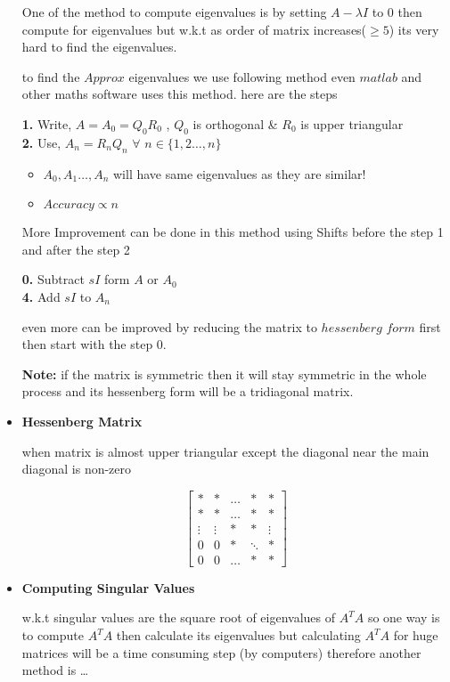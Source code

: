 \documentclass[a4paper]{article}
\numberwithin{equation}{section}
\begin{document}
\begin{itemize}
One of the method to compute eigenvalues is by setting $A-\lambda I$ to 0 then compute for eigenvalues but w.k.t as order of matrix increases($\geq 5$) its very hard to find the eigenvalues.

to find the $Approx$ eigenvalues we use following method even $matlab$ and other maths software uses this method. here are the steps


\textbf{1.} Write, $A=A_0=Q_0R_0$ , $Q_0$ is orthogonal \& $R_0$ is upper triangular\\
\textbf{2.} Use, $A_n=R_nQ_n$ $\forall$ $n \in \{1,2\dots,n\}$
\begin{itemize}
    \item $A_0,A_1\dots,A_n$ will have same eigenvalues as they are similar!
    \item $Accuracy \propto n$
\end{itemize}

More Improvement can be done in this method using Shifts before the step 1 and after the step 2

\textbf{0.} Subtract $sI$ form $A$ or $A_0$\\
\textbf{4.} Add $sI$ to $A_n$

even more can be improved by reducing the matrix to $hessenberg$ $form$ first then start with the step 0.

\textbf{Note:} if the matrix is symmetric then it will stay symmetric in the whole process and its hessenberg form will be a tridiagonal matrix.

\item \textbf{Hessenberg Matrix}

when matrix is almost upper triangular except the diagonal near the main diagonal is non-zero


\[\begin{bmatrix}
    * &*&\dots&*&*\\
    *&*&\dots&*&*\\
    \vdots&\vdots&*&*&\vdots\\
    0&0&*&\ddots&*\\
    0&0&\dots&*&*

\end{bmatrix}\]

\item \textbf{Computing Singular Values}

w.k.t singular values are the square root of eigenvalues of $A^TA$ so one way is to compute $A^TA$ then calculate its eigenvalues but calculating $A^TA$ for huge matrices will be a time consuming step (by computers) therefore another method is \dots


\end{itemize}
\end{document}
